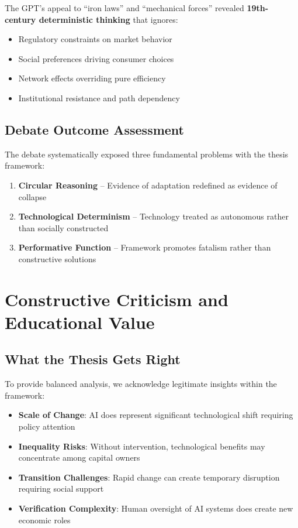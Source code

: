 \documentclass[11pt,a4paper]{article}
\newcommand{\emphasis}[1]{\textbf{\textcolor{primaryblue}{#1}}}
\begin{document}
The GPT's appeal to ``iron laws'' and ``mechanical forces'' revealed \emphasis{19th-century deterministic thinking} that ignores:
\begin{itemize}[leftmargin=*]
\item Regulatory constraints on market behavior
\item Social preferences driving consumer choices
\item Network effects overriding pure efficiency
\item Institutional resistance and path dependency
\end{itemize}

\subsection{Debate Outcome Assessment}

The debate systematically exposed three fundamental problems with the thesis framework:

\begin{enumerate}[leftmargin=*]
\item \textbf{Circular Reasoning} -- Evidence of adaptation redefined as evidence of collapse
\item \textbf{Technological Determinism} -- Technology treated as autonomous rather than socially constructed
\item \textbf{Performative Function} -- Framework promotes fatalism rather than constructive solutions
\end{enumerate}

\section{Constructive Criticism and Educational Value}

\subsection{What the Thesis Gets Right}

To provide balanced analysis, we acknowledge legitimate insights within the framework:

\begin{itemize}[leftmargin=*]
\item \textbf{Scale of Change}: AI does represent significant technological shift requiring policy attention
\item \textbf{Inequality Risks}: Without intervention, technological benefits may concentrate among capital owners  
\item \textbf{Transition Challenges}: Rapid change can create temporary disruption requiring social support
\item \textbf{Verification Complexity}: Human oversight of AI systems does create new economic roles
\end{itemize}
\end{document}
